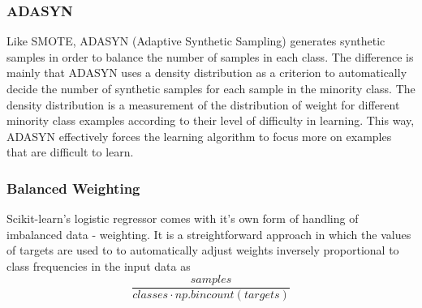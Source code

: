 \subsubsection{ADASYN}
Like SMOTE, ADASYN (Adaptive Synthetic Sampling) generates synthetic samples
in order to balance the number of samples in each class. The difference is
mainly that ADASYN uses a density distribution as a criterion to automatically 
decide the number of synthetic samples for each sample in the minority class.
The density distribution is a measurement of the distribution of weight for 
different minority class examples according to their level of difficulty in
learning. This way, ADASYN effectively forces the learning algorithm to 
focus more on examples that are difficult to learn.

\subsubsection{Balanced Weighting}
Scikit-learn's logistic regressor comes with it's own form of handling of
imbalanced data - weighting. It is a streightforward approach in which 
the values of targets are used to to automatically adjust weights inversely 
proportional to class frequencies in the input data as 
$$\frac{samples}{classes \cdot np.bincount(targets)}$$



